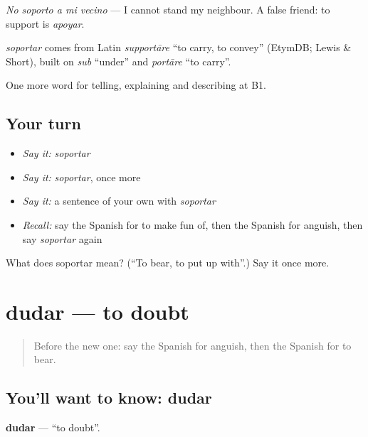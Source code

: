 \emph{No soporto a mi vecino} — I cannot stand my neighbour. A false friend: to support is \emph{apoyar}.

\begin{cousinweb}
\emph{soportar} comes from Latin \emph{supportāre} \textquotedblleft{}to carry, to convey\textquotedblright{} (EtymDB; Lewis \& Short), built on \emph{sub} \textquotedblleft{}under\textquotedblright{} and \emph{portāre} \textquotedblleft{}to carry\textquotedblright{}.
\end{cousinweb}

\begin{grammarlens}[title={What you've built}]
One more word for telling, explaining and describing at B1.
\end{grammarlens}

\subsection*{Your turn}
\begin{itemize}
\raggedright
  \item \emph{Say it:} \emph{soportar}
  \item \emph{Say it:} \emph{soportar}, once more
  \item \emph{Say it:} a sentence of your own with \emph{soportar}
  \item \emph{Recall:} say the Spanish for to make fun of, then the Spanish for anguish, then say \emph{soportar} again
\end{itemize}

\begin{tcolorbox}[breakable,colback=teal!4,colframe=teal!35!black,title={Before you move on}]
What does soportar mean? (\textquotedblleft{}To bear, to put up with\textquotedblright{}.) Say it once more.
\end{tcolorbox}
\section[dudar]{dudar — to doubt}

\label{lesson:ES-C719-dudar}



\begin{quote}
Before the new one: say the Spanish for anguish, then the Spanish for to bear.
\end{quote}

\subsection*{You'll want to know: dudar}
\textbf{dudar} — \textquotedblleft{}to doubt\textquotedblright{}.

